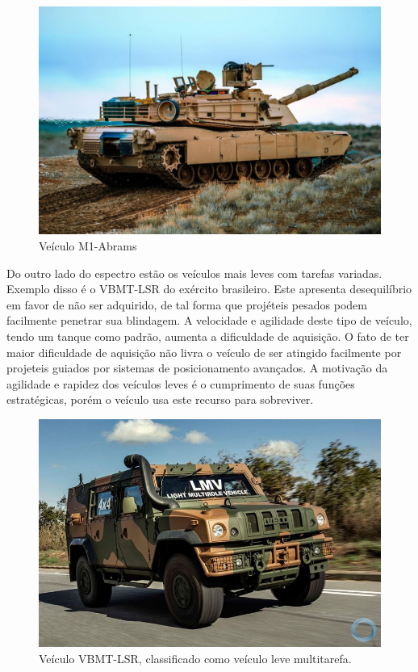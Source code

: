 \begin{figure}[h]
	\caption{\label{fig:0.2} Veículo M1-Abrams}
	\centering
	\includegraphics[width=0.7\linewidth]{images/m1-abrams}
\end{figure}

 Do outro lado do espectro estão os veículos mais leves com tarefas variadas. Exemplo disso é o VBMT-LSR do exército brasileiro. Este apresenta desequilíbrio em favor de não ser adquirido, de tal forma que projéteis pesados podem facilmente penetrar sua blindagem. A velocidade e agilidade deste tipo de veículo, tendo um tanque como padrão, aumenta a dificuldade de aquisição. O fato de ter maior dificuldade de aquisição não livra o veículo de ser atingido facilmente por projeteis guiados por sistemas de posicionamento avançados. A motivação da agilidade e rapidez dos veículos leves é o cumprimento de suas funções estratégicas, porém o veículo usa este recurso para sobreviver. \\
 \begin{figure}[h]
 	\caption{\label{fig:0.3} Veículo VBMT-LSR, classificado como veículo leve multitarefa.}
 	\centering
 	\includegraphics[width=0.7\linewidth]{images/lmv}
 \end{figure} 
\vspace{10mm}

